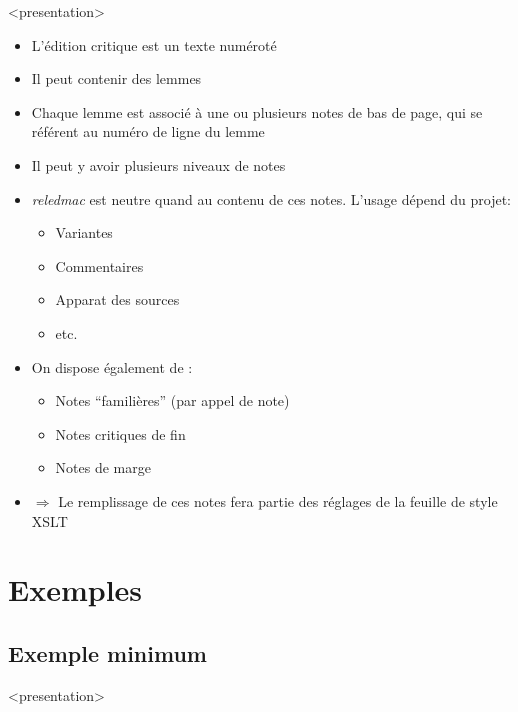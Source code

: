 \documentclass[transnotheorems,noamsthm]{beamer}
\newenvironment{slide}{%
  \begin{frame}
  <presentation>\mode<presentation>{\frametitle{\insertsubsection}}%
  }%
  {\end{frame}}
\newcounter{code}
\newcommand{\package}[1]{\emph{#1}}
\begin{document}
\begin{slide}
  \begin{itemize}
    \item L'édition critique est un \alert{texte numéroté}
    \item Il peut contenir des \alert{lemmes}
    \item Chaque lemme est associé à une ou plusieurs \alert{notes de bas de page}, qui se référent au numéro de ligne du lemme
    \item Il peut y avoir plusieurs niveaux de notes
    \item \package{reledmac} est \alert{neutre} quand au contenu de ces  notes. L'usage dépend du projet:
        \begin{itemize}
          \item Variantes
          \item Commentaires
          \item Apparat des sources
          \item etc.
        \end{itemize}
    \item  On dispose également de :
      \begin{itemize}
        \item Notes \enquote{familières} (par appel de note)
        \item Notes critiques de fin
        \item Notes de marge
      \end{itemize}
    \item \alert{$\Longrightarrow$} Le remplissage de ces notes fera partie des réglages de la feuille de style XSLT
  \end{itemize}
\end{slide}

\section{Exemples}

\subsection{Exemple minimum}

\begin{slide}
  \begin{minipage}{0.8\textwidth}
    
  \end{minipage}
\end{slide}
\end{document}
